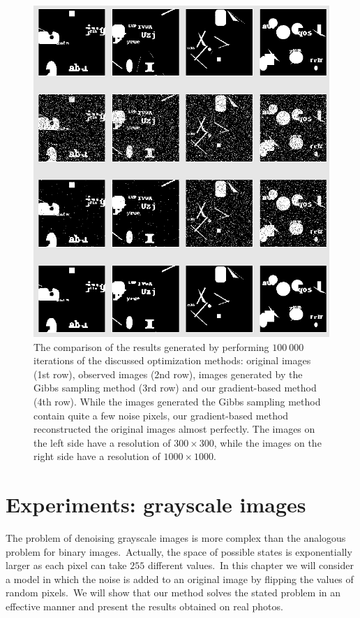 \documentclass[shortabstract, english, lic]{iithesis}
\newcommand\numberedchapter[1]{\setlength\topskip{3cm}\chapter{#1}\setlength\topskip{0cm}}
\theoremstyle{default_theorem_style}\newtheorem{theorem}{Theorem}
\theoremstyle{default_theorem_style}\newtheorem{definition}{Definition}
\begin{document}
\begin{figure}[H]
\centering
\includegraphics[scale=0.52]{binary_qualitative_results}
\caption{The comparison of the results generated by performing $100\ 000$ iterations of the discussed optimization
methods: original images (1st row), observed images (2nd row), images generated by the Gibbs
sampling method (3rd row) and our gradient-based method (4th row). While the images generated the Gibbs sampling
method contain quite a few noise pixels, our gradient-based method reconstructed the original images almost
perfectly. The images on the left side have a resolution of $300{\times}300$, while the images on the right side
have a resolution of $1000{\times}1000$.}
\label{fig:binary_qualitative_results}
\end{figure}

\numberedchapter{Experiments: grayscale images}\label{chapter:grayscale_experiments}

The problem of denoising grayscale images is more complex than the analogous problem for binary
images.\ Actually, the space of possible states is exponentially larger as each pixel can take $255$ different
values.\ In this chapter we will consider a model in which the noise is added to an original image by flipping
the values of random pixels.\ We will show that our method solves the stated problem in an effective manner
and present the results obtained on real photos.
\end{document}
